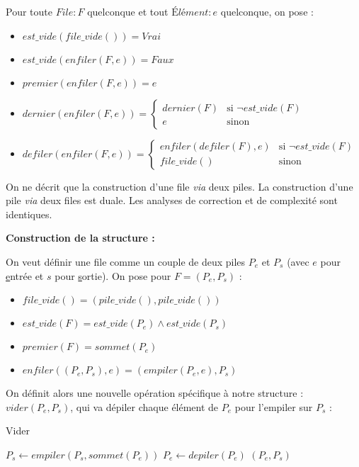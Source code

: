 \documentclass[../main.tex]{subfiles}
\begin{document}
Pour toute $File:F$ quelconque et tout $\textit{Élément}:e$ quelconque, on pose :
\begin{itemize}
	\item $est\_vide(file\_vide()) = \textit{Vrai}$
	\item $est\_vide(enfiler(F, e)) = \textit{Faux}$
	\item $premier(enfiler(F, e)) = e$
	\item $dernier(enfiler(F, e)) = \left\{\begin{array}{ll}dernier(F) & \text{si $\neg est\_vide(F)$} \\ e & \text{sinon}\end{array}\right.$
	\item $defiler(enfiler(F, e)) = \left\{\begin{array}{ll}enfiler(defiler(F), e) & \text{si $\neg est\_vide(F)$} \\ file\_vide() & \text{sinon}\end{array}\right.$
\end{itemize}


On ne décrit que la construction d'une file \textit{via} deux piles. La construction d'une pile \textit{via} deux files est duale. Les analyses de correction et de complexité sont identiques.

\textbf{Construction de la structure :}

On veut définir une file comme un couple de deux piles $P_e$ et $P_s$ (avec $e$ pour \underline{e}ntrée et $s$ pour \underline{s}ortie). On pose pour $F = (P_e, P_s)$ :
\begin{itemize}
	\item $file\_vide() = (pile\_vide(), pile\_vide())$
	\item $est\_vide(F) = est\_vide(P_e)\wedge est\_vide(P_s)$
	\item $premier(F) = sommet(P_e)$
	\item $enfiler((P_e, P_s), e) = (empiler(P_e, e), P_s)$
\end{itemize}
On définit alors une nouvelle opération spécifique à notre structure : $vider(P_e, P_s)$, qui va dépiler chaque élément de $P_e$ pour l'empiler sur $P_s$ :

\begin{algorithm}
\caption{Vider}\label{alg:vider_piles}
 {
	$P_s \leftarrow empiler(P_s, sommet(P_e))$\;
	$P_e \leftarrow depiler(P_e)$\;
}
\Return $(P_e, P_s)$\;
\end{algorithm}
\end{document}
